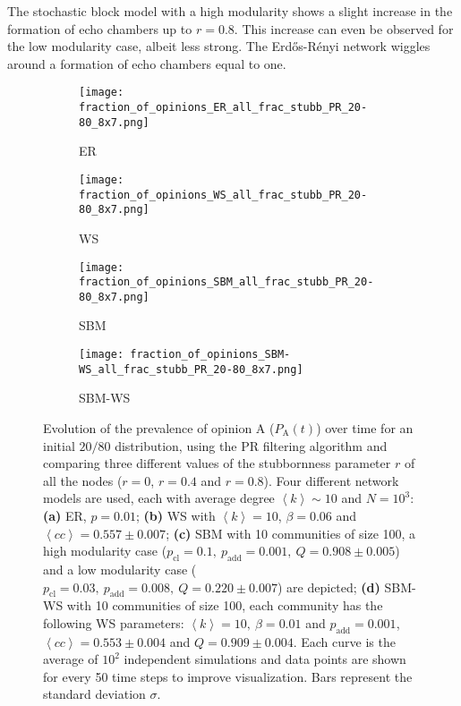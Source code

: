 \documentclass[11 pt , letterpaper , twoside , openright]{book}
\begin{document}
\newline
The stochastic block model with a high modularity shows a slight increase in the formation of echo chambers up to $r = 0.8$. This increase can even be observed for the low modularity case, albeit less strong. The Erd\H{o}s-R\'{e}nyi network wiggles around a formation of echo chambers equal to one.
\newpage
\begin{figure}[H]
  \begin{subfigure}[b]{0.49\textwidth}
    \caption{ER}
  	\texttt{[image: fraction\_of\_opinions\_ER\_all\_frac\_stubb\_PR\_20-80\_8x7.png]}
  \end{subfigure}
  \begin{subfigure}[b]{0.49\textwidth}
    \caption{WS}
  	\texttt{[image: fraction\_of\_opinions\_WS\_all\_frac\_stubb\_PR\_20-80\_8x7.png]}
  \end{subfigure}
  \begin{subfigure}[b]{0.49\textwidth}
    \caption{SBM}
    \texttt{[image: fraction\_of\_opinions\_SBM\_all\_frac\_stubb\_PR\_20-80\_8x7.png]}
  \end{subfigure}
  \begin{subfigure}[b]{0.49\textwidth}
    \caption{SBM-WS}
    \texttt{[image: fraction\_of\_opinions\_SBM-WS\_all\_frac\_stubb\_PR\_20-80\_8x7.png]}
  \end{subfigure}
  \captionsetup{format=plain}
  \caption[Evolution of the prevalence of opinion A ($P_\text{A}(t)$) over time for an initial $20/80$ opinion distribution, using the PR filtering algorithm and comparing three different values of the stubbornness parameter $r$ of all the nodes ($r = 0$, $r = 0.4$ and $r = 0.8$).]{Evolution of the prevalence of opinion A ($P_\text{A}(t)$) over time for an initial $20/80$ distribution, using the PR filtering algorithm and comparing three different values of the stubbornness parameter $r$ of all the nodes ($r = 0$, $r = 0.4$ and $r = 0.8$). Four different network models are used, each with average degree $\left<k\right> \sim 10$ and $N = 10^3$: \textbf{(a)} ER, $p=0.01$; \textbf{(b)} WS with $\left<k\right> = 10$, $\beta = 0.06$ and $\left<cc\right> = 0.557 \pm 0.007$; \textbf{(c)} SBM with 10 communities of size 100, a high modularity case ($p_{\text{cl}} = 0.1,\ p_{\text{add}} = 0.001,\ Q = 0.908 \pm 0.005$) and a low modularity case ($p_{\text{cl}} = 0.03,\ p_{\text{add}} = 0.008,\ Q = 0.220 \pm 0.007$) are depicted; \textbf{(d)} SBM-WS with 10 communities of size 100, each community has the following WS parameters: $\left<k\right> = 10,\ \beta = 0.01$ and $p_{\text{add}} = 0.001$, $\left<cc\right> = 0.553 \pm 0.004$ and $Q = 0.909 \pm 0.004$. Each curve is the average of $10^2$ independent simulations and data points are shown for every 50 time steps to improve visualization. Bars represent the standard deviation $\sigma$.}%
\label{ev_op_20_80_all_frac_stubb_PR}
\end{figure}
\end{document}
